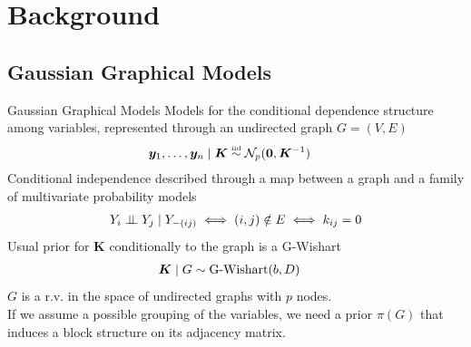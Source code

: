 

\section{Background}

\subsection{Gaussian Graphical Models}
\begin{frame}{Gaussian Graphical Models}
    Models for the \alert{conditional dependence structure} among variables, represented through an undirected graph $G=(V,E)$
    \begin{align*}
    \bm{y}_{1}, \ldots, \bm{y}_{n} \mid \bm{K} &\overset{\text{\tiny{iid}}}{\sim} \mathcal{N}_{p}(\bm{0},\bm{K}^{-1})
    \end{align*}
Conditional independence described through a \alert{map} between a \alert{graph} and a family of multivariate \alert{probability models}
\begin{align*}
Y_{i}\perp \!\!\! \perp Y_{j} \mid Y_{-(ij)} \iff (i,j) \notin E \iff k_{ij}=0
\end{align*}
Usual prior for $\bm{K}$ conditionally to the graph is a G-Wishart
\begin{align*}
    \bm{K} \mid G &\sim \operatorname{G-Wishart}(b,D)
\end{align*}
$G$ is a r.v. in the space of undirected graphs with $p$ nodes.\\
If we assume a possible \alert{grouping} of the variables, we need a prior $\pi(G)$ that induces a \alert{block structure on its adjacency matrix}.
\end{frame}



 

